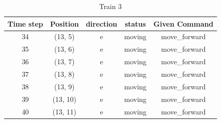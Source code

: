 \begin{table}
\centering
\caption{Train 3}
\label{tab:base3}
\begin{tabular}{c c c c c}
\hline
\textbf{Time step} & \textbf{Position} & \textbf{direction} & \textbf{status} & \textbf{Given Command} \\
\hline
34 & (13, 5) & e & moving & move\_forward \\
35 & (13, 6) & e & moving & move\_forward \\
36 & (13, 7) & e & moving & move\_forward \\
37 & (13, 8) & e & moving & move\_forward \\
38 & (13, 9) & e & moving & move\_forward \\
39 & (13, 10) & e & moving & move\_forward \\
40 & (13, 11) & e & moving & move\_forward \\
\hline
\end{tabular}
\end{table}
